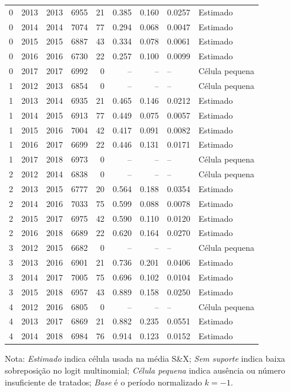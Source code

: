 \begin{longtable}{rrrrrrrll}
0 & 2013 & 2013 & 6955 & 21 & 0.385 & 0.160 & 0.0257 & Estimado \\
0 & 2014 & 2014 & 7074 & 77 & 0.294 & 0.068 & 0.0047 & Estimado \\
0 & 2015 & 2015 & 6887 & 43 & 0.334 & 0.078 & 0.0061 & Estimado \\
0 & 2016 & 2016 & 6730 & 22 & 0.257 & 0.100 & 0.0099 & Estimado \\
0 & 2017 & 2017 & 6992 & 0 & -- & -- & -- & Célula pequena \\
1 & 2012 & 2013 & 6854 & 0 & -- & -- & -- & Célula pequena \\
1 & 2013 & 2014 & 6935 & 21 & 0.465 & 0.146 & 0.0212 & Estimado \\
1 & 2014 & 2015 & 6913 & 77 & 0.449 & 0.075 & 0.0057 & Estimado \\
1 & 2015 & 2016 & 7004 & 42 & 0.417 & 0.091 & 0.0082 & Estimado \\
1 & 2016 & 2017 & 6699 & 22 & 0.446 & 0.131 & 0.0171 & Estimado \\
1 & 2017 & 2018 & 6973 & 0 & -- & -- & -- & Célula pequena \\
2 & 2012 & 2014 & 6838 & 0 & -- & -- & -- & Célula pequena \\
2 & 2013 & 2015 & 6777 & 20 & 0.564 & 0.188 & 0.0354 & Estimado \\
2 & 2014 & 2016 & 7033 & 75 & 0.599 & 0.088 & 0.0078 & Estimado \\
2 & 2015 & 2017 & 6975 & 42 & 0.590 & 0.110 & 0.0120 & Estimado \\
2 & 2016 & 2018 & 6689 & 22 & 0.620 & 0.164 & 0.0270 & Estimado \\
3 & 2012 & 2015 & 6682 & 0 & -- & -- & -- & Célula pequena \\
3 & 2013 & 2016 & 6901 & 21 & 0.736 & 0.201 & 0.0406 & Estimado \\
3 & 2014 & 2017 & 7005 & 75 & 0.696 & 0.102 & 0.0104 & Estimado \\
3 & 2015 & 2018 & 6957 & 43 & 0.889 & 0.158 & 0.0250 & Estimado \\
4 & 2012 & 2016 & 6805 & 0 & -- & -- & -- & Célula pequena \\
4 & 2013 & 2017 & 6869 & 21 & 0.882 & 0.235 & 0.0551 & Estimado \\
4 & 2014 & 2018 & 6984 & 76 & 0.914 & 0.123 & 0.0152 & Estimado \\
\end{longtable}
\vspace{-0.35cm}
\noindent\footnotesize Nota: \textit{Estimado} indica célula usada na média S\&X; \textit{Sem suporte} indica baixa sobreposição no logit multinomial; \textit{Célula pequena} indica ausência ou número insuficiente de tratados; \textit{Base} é o período normalizado \(k=-1\).
\par\endgroup
